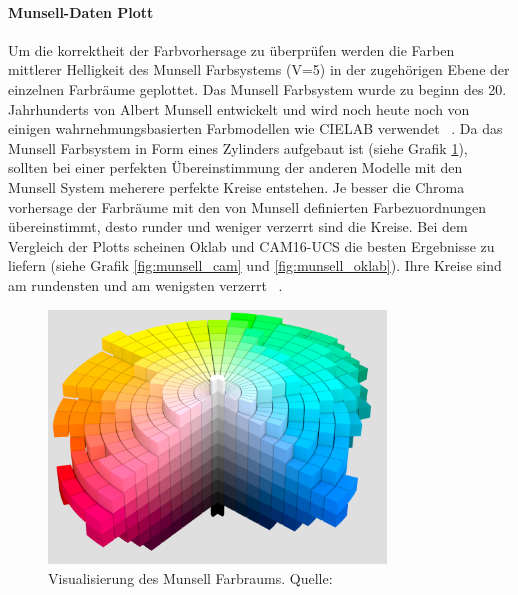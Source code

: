 \documentclass[12pt, a4paper, ngerman]{article}
\begin{document}
\paragraph{Munsell-Daten Plott}
Um die korrektheit der Farbvorhersage zu überprüfen werden die Farben mittlerer Helligkeit des Munsell Farbsystems (V=5) 
in der zugehörigen Ebene der einzelnen Farbräume geplottet. 
Das Munsell Farbsystem wurde zu beginn des 20. Jahrhunderts von Albert Munsell entwickelt und 
wird noch heute noch von einigen wahrnehmungsbasierten Farbmodellen wie CIELAB verwendet ~\cite{Munsell_color_system_2022}.
Da das Munsell Farbsystem in Form eines Zylinders aufgebaut ist (siehe Grafik \ref{fig:munsel}), 
sollten bei einer perfekten Übereinstimmung der anderen Modelle mit den Munsell System meherere perfekte Kreise entstehen.
Je besser die Chroma vorhersage der Farbräume mit den von Munsell definierten Farbezuordnungen übereinstimmt, 
desto runder und weniger verzerrt sind die Kreise. Bei dem Vergleich der Plotts scheinen Oklab und CAM16-UCS die besten Ergebnisse zu liefern (siehe Grafik \ref{fig:munsell_cam} und \ref{fig:munsell_oklab}). 
Ihre Kreise sind am rundensten und am wenigsten verzerrt ~\cite{Oklab_2020}.

\begin{figure}
  \centering
  \includegraphics[width=0.8\textwidth]{Grafiken/Munsell_Farbraum.png}
  \caption{Visualisierung des Munsell Farbraums. Quelle: ~\cite{Munsell_color_system_2022}}
  \label{fig:munsel}
\end{figure}
\end{document}
